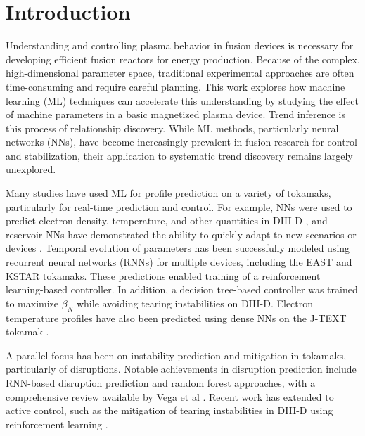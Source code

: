 \section{Introduction}

Understanding and controlling plasma behavior in fusion devices is necessary for developing efficient fusion reactors for energy production. Because of the complex, high-dimensional parameter space, traditional experimental approaches are often time-consuming and require careful planning. This work explores how machine learning (ML) techniques can accelerate this understanding by studying the effect of machine parameters in a basic magnetized plasma device. Trend inference is this process of relationship discovery. While ML methods, particularly neural networks (NNs), have become increasingly prevalent in fusion research for control and stabilization, their application to systematic trend discovery remains largely unexplored.

Many studies have used ML for profile prediction on a variety of tokamaks, particularly for real-time prediction and control. For example, NNs were used to predict electron density, temperature, and other quantities in DIII-D \cite{abbate_data-driven_2021}, and reservoir NNs have demonstrated the ability to quickly adapt to new scenarios or devices \cite{jalalvand_real-time_2022}. Temporal evolution of parameters has been successfully modeled using recurrent neural networks (RNNs)\cite{char_full_2024} for multiple devices, including the EAST\cite{wan_east_2022} and KSTAR tokamaks\cite{seo_feedforward_2021,seo_development_2022}. These predictions enabled training of a reinforcement learning-based controller\cite{seo_feedforward_2021,seo_development_2022}. In addition, a decision tree-based controller was trained to maximize $\beta_N$ while avoiding tearing instabilities\cite{fu_machine_2020} on DIII-D. Electron temperature profiles have also been predicted using dense NNs on the J-TEXT tokamak \cite{dong_machine_2021}.

A parallel focus has been on instability prediction and mitigation in tokamaks, particularly of disruptions. Notable achievements in disruption prediction include RNN-based disruption prediction \cite{kates-harbeck_predicting_2019} and random forest approaches\cite{rea_real-time_2019}, with a comprehensive review available by Vega et al \cite{vega_disruption_2022}. Recent work has extended to active control, such as the mitigation of tearing instabilities in DIII-D using reinforcement learning \cite{seo_avoiding_2024}. 

